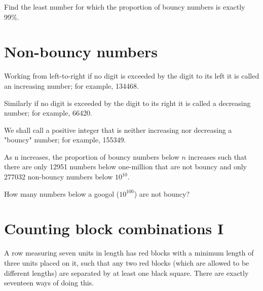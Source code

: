 Find the least number for which the proportion of bouncy numbers is exactly 99\%.


\section{Non-bouncy numbers} \label{pb.0113}

Working from left-to-right if no digit is exceeded by the digit to its left it is called an increasing number; for example, 134468.

Similarly if no digit is exceeded by the digit to its right it is called a decreasing number; for example, 66420.

We shall call a positive integer that is neither increasing nor decreasing a "bouncy" number; for example, 155349.

As n increases, the proportion of bouncy numbers below $n$ increases such that there are only 12951 numbers below one-million that are not bouncy and only 277032 non-bouncy numbers below $10^{10}$.

How many numbers below a googol ($10^{100}$) are not bouncy?


\section{Counting block combinations I} \label{pb.0114}

A row measuring seven units in length has red blocks with a minimum length of three units placed on it, such that any two red blocks (which are allowed to be different lengths) are separated by at least one black square. There are exactly seventeen ways of doing this.

